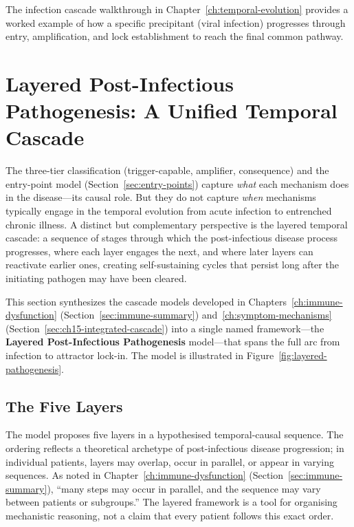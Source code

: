 The infection cascade walkthrough in Chapter~\ref{ch:temporal-evolution} provides a worked example of how a specific precipitant (viral infection) progresses through entry, amplification, and lock establishment to reach the final common pathway.



\section{Layered Post-Infectious Pathogenesis: A Unified Temporal Cascade}
\label{sec:layered-post-infectious}

The three-tier classification (trigger-capable, amplifier, consequence) and the entry-point model (Section~\ref{sec:entry-points}) capture \emph{what} each mechanism does in the disease---its causal role. But they do not capture \emph{when} mechanisms typically engage in the temporal evolution from acute infection to entrenched chronic illness. A distinct but complementary perspective is the layered temporal cascade: a sequence of stages through which the post-infectious disease process progresses, where each layer engages the next, and where later layers can reactivate earlier ones, creating self-sustaining cycles that persist long after the initiating pathogen may have been cleared.

This section synthesizes the cascade models developed in Chapters~\ref{ch:immune-dysfunction} (Section~\ref{sec:immune-summary}) and~\ref{ch:symptom-mechanisms} (Section~\ref{sec:ch15-integrated-cascade}) into a single named framework---the \textbf{Layered Post-Infectious Pathogenesis} model---that spans the full arc from infection to attractor lock-in. The model is illustrated in Figure~\ref{fig:layered-pathogenesis}.

\subsection{The Five Layers}

The model proposes five layers in a hypothesised temporal-causal sequence. The ordering reflects a theoretical archetype of post-infectious disease progression; in individual patients, layers may overlap, occur in parallel, or appear in varying sequences. As noted in Chapter~\ref{ch:immune-dysfunction} (Section~\ref{sec:immune-summary}), ``many steps may occur in parallel, and the sequence may vary between patients or subgroups.'' The layered framework is a tool for organising mechanistic reasoning, not a claim that every patient follows this exact order.

